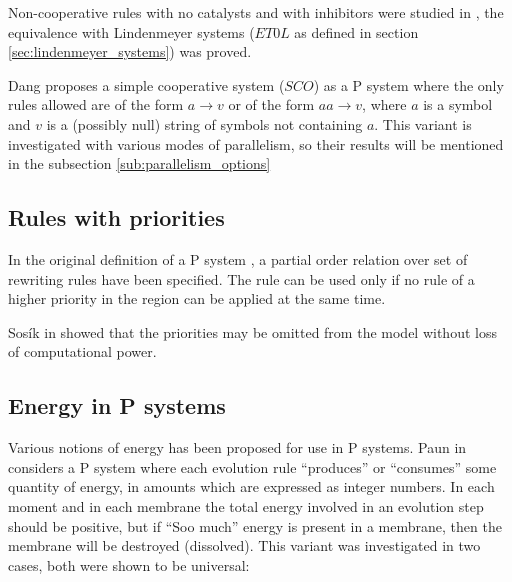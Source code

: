 
Non-cooperative rules with no catalysts and with inhibitors were studied in \cite{Sburlan:2006:FurtherResultsPromotersInhibitors}, the equivalence with Lindenmeyer systems ($ET0L$ as defined in section \ref{sec:lindenmeyer_systems}) was proved.


Dang \cite{Ibarra04dang} proposes a simple cooperative system ($SCO$) as a P system where the only rules allowed are of the form $a\rightarrow v$ or of the form $aa\rightarrow v$, where $a$ is a symbol and $v$ is a (possibly null) string of symbols not containing $a$. This variant is investigated with various modes of parallelism, so their results will be mentioned in the subsection \ref{sub:parallelism_options}


\subsection{Rules with priorities} %
\label{sub:rules_with_priorities}

In the original definition of a P system \cite{Paun98}, a partial order relation over set of rewriting rules have been specified. The rule can be used only if no rule of a higher priority in the region can be applied at the same time.

Sos\'ik in \cite{Sosik:2002:WithoutPriorities} showed that the priorities may be omitted from the model without loss of computational power.


\subsection{Energy in P systems} %
\label{sub:energy_in_p_systems}

Various notions of energy has been proposed for use in P systems. Paun in \cite{Paun:2001:Energy} considers a P system where each evolution rule ``produces'' or ``consumes'' some quantity of energy, in amounts which are expressed as integer numbers. In each moment and in each membrane the total energy involved in an evolution step should be positive, but if ``Soo much'' energy is present in a membrane, then the membrane will be destroyed (dissolved). This variant was investigated in two cases, both were shown to be universal:

